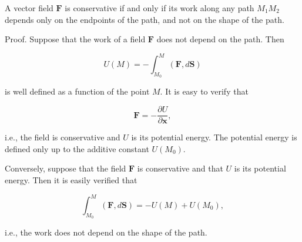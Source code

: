 A vector field $\mathbf{F}$ is conservative if and only if its work along any path $M_1M_2$ depends only on the endpoints of the path, and not on the shape of the path.

Proof. Suppose that the work of a field $\mathbf{F}$ does not depend on the path. Then

$$U(M) = - \int_{M_0}^{M} (\mathbf{F}, d\mathbf{S})$$

is well defined as a function of the point $M$. It is easy to verify that

$$\mathbf{F} = - \frac{\partial U}{\partial \mathbf{x}},$$

i.e., the field is conservative and $U$ is its potential energy. The potential energy is defined only up to the additive constant $U(M_0)$.

Conversely, suppose that the field $\mathbf{F}$ is conservative and that $U$ is its potential energy. Then it is easily verified that

$$\int_{M_0}^{M} (\mathbf{F}, d\mathbf{S}) = - U(M) + U(M_0),$$

i.e., the work does not depend on the shape of the path.
